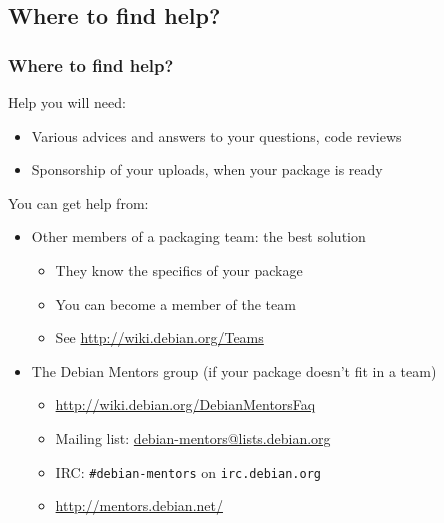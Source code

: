 \documentclass[10pt,final]{beamer}
\begin{document}
\subsection{Where to find help?}
\begin{frame}
\frametitle{Where to find help?}
Help you will need:
\begin{itemize}
	\item Various advices and answers to your questions, code reviews
	\item Sponsorship of your uploads, when your package is ready
\end{itemize}
\br
You can get help from:
\begin{itemize}
	\item Other members of a packaging team: the best solution
		\begin{itemize}
			\item They know the specifics of your package
			\item You can become a member of the team
			\item See \url{http://wiki.debian.org/Teams}
		\end{itemize}
	\hbr
	\item The Debian Mentors group (if your package doesn't fit in a team)
		\begin{itemize}
			\item \url{http://wiki.debian.org/DebianMentorsFaq}
			\item Mailing list: \url{debian-mentors@lists.debian.org}
			\item IRC: \texttt{\#debian-mentors} on \texttt{irc.debian.org}
			\item \url{http://mentors.debian.net/}
		\end{itemize}
\end{itemize}
\end{frame}
\end{document}
